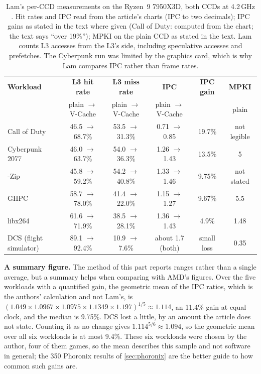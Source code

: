 \begin{table}[htbp]
  \centering
  \caption[Lam's per-CCD measurements on the Ryzen~9 7950X3D, both CCDs at 4.2\,GHz]{Lam's per-CCD measurements on the Ryzen~9 7950X3D, both CCDs at 4.2\,GHz \cite{lamAMDs7950X3DZen2023}. Hit rates and IPC read from the article's charts (IPC to two decimals); IPC gains as stated in the text where given (Call of Duty: computed from the chart; the text says ``over 19\%''); MPKI on the plain CCD as stated in the text. Lam counts L3 accesses from the L3's side, including speculative accesses and prefetches. The Cyberpunk run was limited by the graphics card, which is why Lam compares IPC rather than frame rates.}
  \label{tab:lam-detail}
  \footnotesize
  \begin{tabularx}{\textwidth}{@{}>{\raggedright\arraybackslash}X cccc c@{}}
    \toprule
    \textbf{Workload} & \textbf{L3 hit rate} & \textbf{L3 miss rate} & \textbf{IPC} & \textbf{IPC gain} & \textbf{MPKI} \\
    & plain $\to$ V-Cache & plain $\to$ V-Cache & plain $\to$ V-Cache & & plain \\
    \midrule
    Call of Duty & 46.5 $\to$ 68.7\% & 53.5 $\to$ 31.3\% & 0.71 $\to$ 0.85 & 19.7\% & not legible \\
    Cyberpunk 2077 & 46.0 $\to$ 63.7\% & 54.0 $\to$ 36.3\% & 1.26 $\to$ 1.43 & 13.5\% & 5 \\
    7-Zip & 45.8 $\to$ 59.2\% & 54.2 $\to$ 40.8\% & 1.33 $\to$ 1.46 & 9.75\% & not stated \\
    GHPC & 58.7 $\to$ 78.0\% & 41.4 $\to$ 22.0\% & 1.15 $\to$ 1.27 & 9.67\% & 5.5 \\
    libx264 & 61.6 $\to$ 71.9\% & 38.5 $\to$ 28.1\% & 1.36 $\to$ 1.43 & 4.9\% & 1.48 \\
    DCS (flight simulator) & 89.1 $\to$ 92.4\% & 10.9 $\to$ 7.6\% & about 1.7 (both) & small loss & 0.35 \\
    \bottomrule
  \end{tabularx}
\end{table}

\textbf{A summary figure.} The method of this part reports ranges rather than a single average, but a summary helps when comparing with AMD's figures. Over the five workloads with a quantified gain, the geometric mean of the IPC ratios, which is the authors' calculation and not Lam's, is $(1.049 \times 1.0967 \times 1.0975 \times 1.1349 \times 1.197)^{1/5} \approx 1.114$, an 11.4\% gain at equal clock, and the median is 9.75\%. DCS lost a little, by an amount the article does not state. Counting it as no change gives $1.114^{5/6} \approx 1.094$, so the geometric mean over all six workloads is at most 9.4\%. These six workloads were chosen by the author, four of them games, so the mean describes this sample and not software in general; the 350 Phoronix results of \cref{sec:phoronix} are the better guide to how common such gains are.

